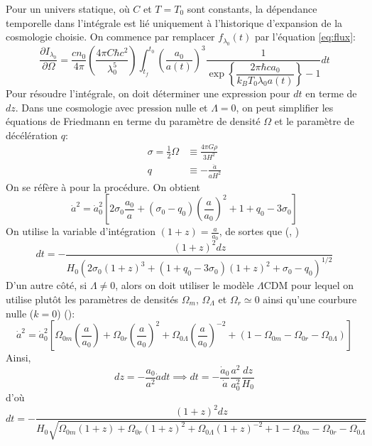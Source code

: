 \documentclass{article}
\numberwithin{equation}{section}
\begin{document}
Pour un univers statique, où $C$ et $T = T_0$ sont constants, la dépendance temporelle 
dans l'intégrale est lié uniquement à l'historique d'expansion de la cosmologie choisie. On 
commence par remplacer $f_{\lambda_0}(t)$ par l'équation \eqref{eq:flux}:
\[
        \frac{\partial I_{\lambda_0}}{\partial \Omega} = 
        \frac{c n_0}{4\pi}\left( \frac{4\pi C \hbar c^2}{\lambda_0^5} \right)
        \int_{t_f}^{t_0} \left( \frac{a_0}{a(t)} \right)^{3}
        \frac{1}{\exp \left\{ \dfrac{2 \pi \hbar ca_0}{k_B T_0 \lambda_0 a(t)} \right\} - 1}
        dt
\]
Pour résoudre l'intégrale, on doit déterminer une expression pour $dt$ en terme de 
$dz$. Dans une cosmologie 
avec pression nulle et $\Lambda=0$, on peut simplifier les équations de 
Friedmann en terme du paramètre 
de densité $\Omega$ et 
le paramètre de décélération $q$:
\begin{align*}
        \sigma = \frac{1}{2}\Omega &\equiv \frac{4 \pi G \rho}{3H^2} \\
        q &\equiv - \frac{\ddot{a}}{aH^2}
\end{align*}
On se réfère à \cite{Stabell1966} pour la procédure. On obtient
\begin{equation}\label{eq:FriedmannStabell} 
        \dot{a}^2 = \dot{a}_0^2 \left[ 2 \sigma_0 \frac{a_0}{a} +
        (\sigma_0 - q_0)\left( \frac{a}{a_0} \right)^{2} + 1 + q_0 - 3\sigma_0 \right]
\end{equation} 
On utilise la variable d'intégration $(1 + z) = \frac{a}{a_0}$, 
de sortes que (\cite{Wesson1987}, \cite{Wesson1991})
\[
        dt =  - \frac{(1 + z)^2 dz}{
H_0(2 \sigma_0(1 + z)^{3} + (1 + q_0 - 3\sigma_0)(1 + z)^{2} + \sigma_0 - q_0)^{1/2}}
\]
D'un autre côté, si $\Lambda \not= 0$, alors on doit utiliser le modèle $\Lambda$CDM pour 
lequel on utilise plutôt les paramètres de densités $\Omega_{m}$, 
$\Omega_\Lambda$ et $\Omega_r \simeq 0$ ainsi qu'une courbure nulle ($k=0$)
(\cite{coles2003cosmology}):
\[
        \dot{a}^2 = \dot{a}_0^2 \left[ 
                \Omega_{0m} \left( \frac{a}{a_0}\right)+ 
                \Omega_{0r} \left( \frac{a}{a_0} \right)^{2}+
        \Omega_{0\Lambda} \left( \frac{a}{a_0} \right)^{-2}
        + 
        (1 - \Omega_{0m} - \Omega_{0r} - \Omega_{0\Lambda})
\right]
\]
Ainsi,
\[
        dz = -\frac{a_0}{a^2} \dot{a}dt \implies 
        dt = - \frac{\dot{a}_0}{\dot{a}}\frac{a^2}{a_0^2} \frac{dz}{H_0}
\]
d'où
\[
        dt = -\frac{(1 + z)^{2} dz}{H_0 \sqrt{\Omega_{0m}(1 + z) 
        + \Omega_{0r}(1 + z)^{2} + \Omega_{0\Lambda}(1 + z)^{-2}
        + 1 - \Omega_{0m} - \Omega_{0r} - \Omega_{0\Lambda}}}
\]
\end{document}
